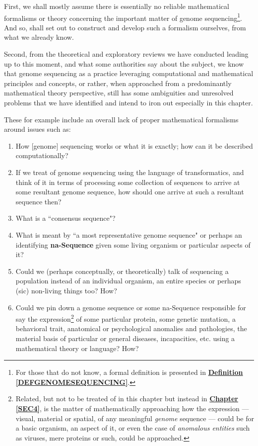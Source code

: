 \documentclass[a4paper, 18pt]{book} %
\begin{document}
First, we shall mostly assume there is essentially no reliable mathematical formalisms or theory concerning the important matter of genome sequencing\footnote{For those that do not know, a formal definition is presented in \textbf{\hyperref[DEFGENOMESEQUENCING]{Definition \ref{DEFGENOMESEQUENCING}}}.}. And so, shall set out to construct and develop such a formalism ourselves, from what we already know.

Second, from the theoretical and exploratory reviews we have conducted leading up to this moment, and what some authorities\cite{przytycka_wgs_lecture10} say about the subject, we know that genome sequencing as a practice leveraging computational and mathematical principles and concepts, or rather, when approached from a predominantly mathematical theory perspective, still has some ambiguities and unresolved problems that we have identified and intend to iron out especially in this chapter.

These for example include an overall lack of proper mathematical formalisms around  issues such as:

\begin{enumerate}
\item How [genome] sequencing works or what it is exactly; how can it be described computationally?
\item If we treat of genome sequencing using the language of transformatics, and think of it in terms of processing some collection of sequences to arrive at some resultant genome sequence, how should one arrive at such a resultant sequence then? 
\item What is a ``consensus sequence"\cite{przytycka_wgs_lecture10}?
\item What is meant by ``a most representative genome sequence" or perhaps an identifying \textbf{na-Sequence} given some living organism or particular aspects of it?
\item Could we (perhaps conceptually, or theoretically) talk of sequencing a population instead of an individual organism, an entire species or perhaps (sic) non-living things too? How?
\item Could we pin down a genome sequence or some na-Sequence responsible for say the expression\footnote{Related, but not to be treated of in this chapter but instead in \textbf{\hyperref[SEC4]{Chapter \ref{SEC4}}}, is the matter of mathematically approaching how the expression --- visual, material or spatial, of any meaningful \textit{genome} sequence --- could be for a basic organism, an aspect of it, or even the case of \textit{anomalous entities} such as viruses, mere proteins or such, could be approached.} of some particular protein, some genetic mutation, a behavioral trait, anatomical or psychological anomalies and pathologies, the material basis of particular or general diseases, incapacities, etc. using a mathematical theory or language? How?
\end{enumerate}
\end{document}
